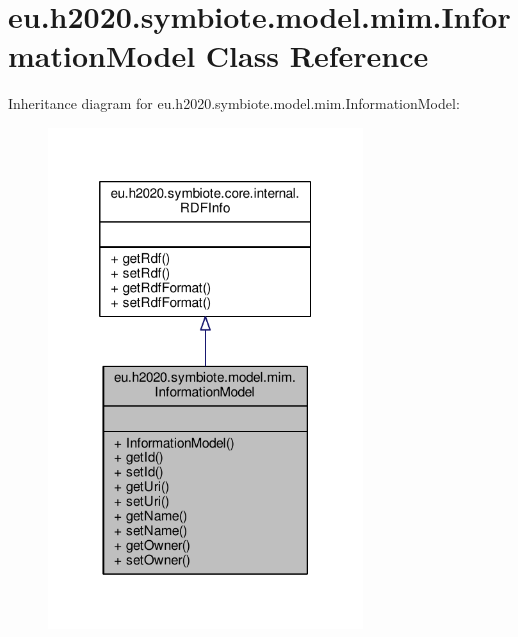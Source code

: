 \hypertarget{classeu_1_1h2020_1_1symbiote_1_1model_1_1mim_1_1InformationModel}{}\section{eu.\+h2020.\+symbiote.\+model.\+mim.\+Information\+Model Class Reference}
\label{classeu_1_1h2020_1_1symbiote_1_1model_1_1mim_1_1InformationModel}


Inheritance diagram for eu.\+h2020.\+symbiote.\+model.\+mim.\+Information\+Model\+:\nopagebreak
\begin{figure}[H]
\begin{center}
\leavevmode
\includegraphics[width=236pt]{classeu_1_1h2020_1_1symbiote_1_1model_1_1mim_1_1InformationModel__inherit__graph}
\end{center}
\end{figure}


